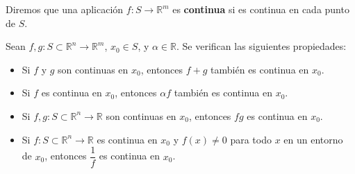 \begin{definición}
    Diremos que una aplicación \( f : S \to \mathbb{R}^m \) es \textbf{continua} si es continua en cada punto de \( S \).
\end{definición}
\begin{observación}
    Sean \( f, g : S \subset \mathbb{R}^n \to \mathbb{R}^m \), \( x_0 \in S \), y \( \alpha \in \mathbb{R} \). Se verifican las siguientes propiedades:

\begin{itemize}
    \item Si \( f \) y \( g \) son continuas en \( x_0 \), entonces \( f + g \) también es continua en \( x_0 \).
    
    \item Si \( f \) es continua en \( x_0 \), entonces \( \alpha f \) también es continua en \( x_0 \).
    
    \item Si \( f, g : S \subset \mathbb{R}^n \to \mathbb{R} \) son continuas en \( x_0 \), entonces \( fg \) es continua en \( x_0 \).
    
    \item Si \( f : S \subset \mathbb{R}^n \to \mathbb{R} \) es continua en \( x_0 \) y \( f(x) \ne 0 \) para todo \( x \) en un entorno de \( x_0 \), entonces \( \dfrac{1}{f} \) es continua en \( x_0 \).
\end{itemize}
\end{observación}

